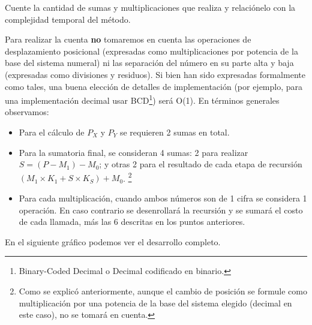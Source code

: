 \documentclass[titlepage,a4paper]{article}
\begin{document}
\begin{tcolorbox}[colback=blue!5!white,colframe=blue!75!black,title=Enunciado 1.2]
    Cuente la cantidad de sumas y multiplicaciones que realiza y relaciónelo con la complejidad temporal del método.
\end{tcolorbox}

Para realizar la cuenta \textbf{no} tomaremos en cuenta las operaciones de desplazamiento posicional
(expresadas como multiplicaciones por potencia de la base del sistema numeral) ni las separación del
número en su parte alta y baja (expresadas como divisiones y residuos). Si bien han sido expresadas
formalmente como tales, una buena elección de detalles de implementación (por ejemplo, para una
implementación decimal usar BCD\footnote{Binary-Coded Decimal o Decimal codificado en binario.})
será O(1). En términos generales observamos:
\begin{itemize}
    \item Para el cálculo de $P_X$ y $P_Y$ se requieren 2 sumas en total.
    \item Para la sumatoria final, se consideran 4 sumas: 2 para realizar $S = (P-M_1)-M_0$;
    y otras 2 para el resultado de cada etapa de recursión $(M_1\times K_1 + S\times K_S) + M_0$.
    \footnote{Como se explicó anteriormente, aunque el cambio de posición se formule como multiplicación
    por una potencia de la base del sistema elegido (decimal en este caso), no se tomará en cuenta.}
    \item Para cada multiplicación, cuando ambos números son de 1 cifra se considera 1 operación.
    En caso contrario se desenrollará la recursión y se sumará el costo de cada llamada,
    más las 6 descritas en los puntos anteriores.
\end{itemize}

En el siguiente gráfico podemos ver el desarrollo completo.
\end{document}
